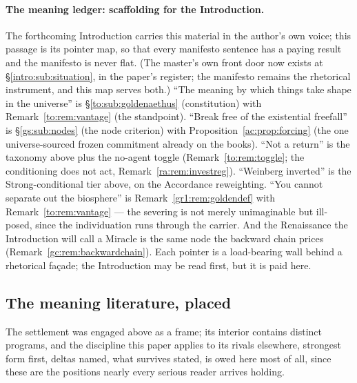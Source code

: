 \documentclass[11pt]{article}
\numberwithin{equation}{section}
\theoremstyle{plain}
\theoremstyle{definition}
\theoremstyle{remark}
\begin{document}
\paragraph{The meaning ledger: scaffolding for the Introduction.}\label{gs:rem:meaningledger}
The forthcoming Introduction carries this material in the author's
own voice; this passage is its pointer map, so that every manifesto
sentence has a paying result and the manifesto is never flat. (The
master's own front door now exists at \S\ref{intro:sub:situation},
in the paper's register; the manifesto remains the rhetorical
instrument, and this map serves both.) ``The
meaning by which things take shape in the universe'' is
\S\ref{to:sub:goldenaethus} (constitution) with
Remark~\ref{to:rem:vantage} (the standpoint). ``Break free of the
existential freefall'' is \S\ref{gs:sub:nodes} (the node criterion)
with Proposition~\ref{ac:prop:forcing} (the one universe-sourced
frozen commitment already on the books). ``Not a return'' is the
taxonomy above plus the no-agent toggle
(Remark~\ref{to:rem:toggle}; the conditioning does not act,
Remark~\ref{ra:rem:investreg}). ``Weinberg inverted'' is the
Strong-conditional tier above, on the Accordance reweighting. ``You
cannot separate out the biosphere'' is
Remark~\ref{gr1:rem:goldendef} with Remark~\ref{to:rem:vantage} ---
the severing is not merely unimaginable but ill-posed, since the
individuation runs through the carrier. And the Renaissance the
Introduction will call a Miracle is the same node the backward chain
prices (Remark~\ref{gc:rem:backwardchain}). Each pointer is a
load-bearing wall behind a rhetorical fa\c{c}ade; the Introduction
may be read first, but it is paid here.

\subsection{The meaning literature, placed}\label{gs:sub:meaningplacement}

The settlement was engaged above as a frame; its interior contains
distinct programs, and the discipline this paper applies to its rivals
elsewhere, strongest form first, deltas named, what survives stated, is owed here most of all, since these are the positions nearly
every serious reader arrives holding.
\end{document}
